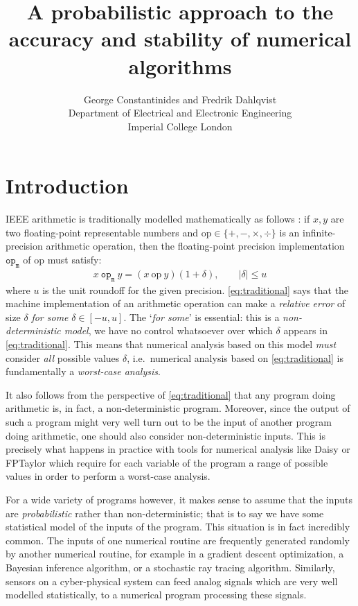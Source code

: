 \documentclass[10pt,conference]{IEEEtran}
\title{A probabilistic approach to the accuracy and stability of numerical algorithms}
\author{George Constantinides and Fredrik Dahlqvist \\ Department of Electrical and Electronic Engineering\\ Imperial College London}
\newcommand{\ie}{i.e.\ }
\newcommand{\absv}[1]{\vert #1\vert}
\newcommand{\mop}{\mathtt{op_m}}
\newcommand{\iop}{\mathrm{op}}
\begin{document}
\maketitle

\begin{abstract}

\end{abstract}

\section{Introduction}

IEEE arithmetic \cite{ieee754} is traditionally modelled mathematically as follows \cite{higham2002accuracy}: if $x,y$ are two floating-point representable numbers and $\iop\in\{+,-,\times,\div\}$ is an infinite-precision arithmetic operation, then the floating-point precision implementation $\mop$ of $\iop$ must satisfy:
\begin{align}
x~\mop~y=(x~\iop~y)(1+\delta), \qquad\absv{\delta}\leq u\label{eq:traditional}
\end{align}
where $u$ is the unit roundoff for the given precision. \cref{eq:traditional} says that the machine implementation of an arithmetic operation can make a \emph{relative error} of size $\delta$ \emph{for some} $\delta\in\left[-u,u\right]$. The `\emph{for some}' is essential: this is a \emph{non-deterministic model}, we have no control whatsoever over which $\delta$ appears in \cref{eq:traditional}. This means that numerical analysis based on this model \emph{must} consider \emph{all} possible values $\delta$, \ie numerical analysis based on \cref{eq:traditional} is fundamentally a \emph{worst-case analysis}. 

It also follows from the perspective of \cref{eq:traditional} that any program doing arithmetic is, in fact, a non-deterministic program. Moreover, since the output of such a program might very well turn out to be the input of another program doing arithmetic, one should also consider non-deterministic inputs. This is precisely what happens in practice with tools for numerical analysis like Daisy \cite{darulova2018daisy} or FPTaylor \cite{solovyev2018rigorous} which require for each variable of the program a range of possible values in order to perform a worst-case analysis.

For a wide variety of programs however, it makes sense to assume that the inputs are \emph{probabilistic} rather than non-deterministic; that is to say we have some statistical model of the inputs of the program. This situation is in fact incredibly common. The inputs of one numerical routine are frequently generated randomly by another numerical routine, for example in a gradient descent optimization, a Bayesian inference algorithm, or a stochastic ray tracing algorithm. Similarly, sensors on a cyber-physical system can feed analog signals which are very well modelled statistically, to a numerical program processing these signals. 
\end{document}
